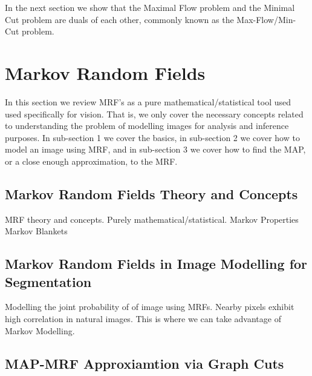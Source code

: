 In the next section we show that the Maximal Flow problem and the Minimal Cut problem are duals of each other, commonly known as the Max-Flow/Min-Cut problem.


\section{Markov Random Fields}
\label{sec:MarkovRandomFields}

In this section we review MRF's as a pure mathematical/statistical tool used used specifically for vision. That is, we only cover the necessary concepts related to understanding 
the problem of modelling images for analysis and inference purposes. In sub-section 1 we cover the basics, in sub-section 2 we cover how to model an image using MRF, and 
in sub-section 3 we cover how to find the MAP, or a close enough approximation, to the MRF.


\subsection{Markov Random Fields Theory and Concepts}

MRF theory and concepts. Purely mathematical/statistical.
Markov Properties\\
Markov Blankets


\subsection{Markov Random Fields in Image Modelling for Segmentation}

Modelling the joint probability of of image using MRFs.
Nearby pixels exhibit high correlation in natural images. This is where we can take advantage of Markov Modelling.


\subsection{MAP-MRF Approxiamtion via Graph Cuts}

